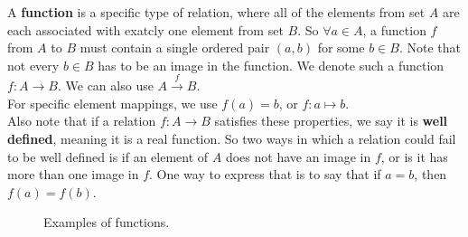 \documentclass[12pt]{article}
\begin{document}
    A \textbf{function} is a specific type of relation, 
    where all of the elements from set $A$
    are each associated with exatcly one element from set $B$.
    So $\forall a \in A$,
    a function $f$ from $A$ to $B$
    must contain a single ordered pair $(a, b)$ for some $b \in B$.
    Note that not every $b \in B$ has to be an image in the function.
    We denote such a function $f: A \rightarrow B$.
    We can also use $A \stackrel{f}{\rightarrow} B$. \\
    For specific element mappings,
    we use $f(a) = b$, or $f: a \mapsto b$. \\
    Also note that if a relation  $f: A \rightarrow B$
    satisfies these properties,
    we say it is \textbf{well defined},
    meaning it is a real function.
    So two ways in which a relation could fail to be well defined
    is if an element of $A$ does not have an image in $f$,
    or is it has more than one image in $f$.
    One way to express that is to say that
    if $a = b$, then $f(a) = f(b)$.

    \begin{figure}[H]
        \centering


        \caption{\label{fig:figure1} Examples of functions.}
    \end{figure}
\end{document}
